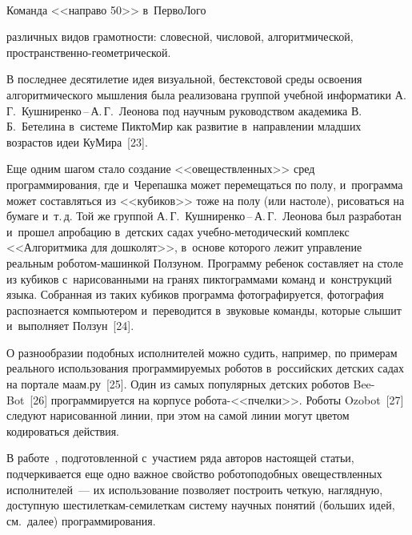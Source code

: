 \begin{multicols}{2}
{ \begin{center}  %
 \vspace*{12pt}
   \mbox{%
 \epsfxsize=79mm 
 }



\vspace*{6pt}
 
{\small{Команда <<направо 50>> в~ПервоЛого
}}
\end{center}}

\noindent
 различных 
видов грамотности: словесной, числовой, алгоритмической, 
про\-стран\-ст\-вен\-но-гео\-мет\-ри\-че\-ской.
  
  В последнее десятилетие идея визуальной, бестекстовой среды освоения 
алгоритмического мышления была реализована группой учебной 
информатики А.\,Г.~Кушниренко\,--\,А.\,Г.~Леонова под научным 
руководством академика В.\,Б.~Бетелина в~системе ПиктоМир как развитие 
в~направлении младших возрастов идеи  КуМира~[23].
  
  Еще одним шагом стало создание <<овеществленных>> сред 
программирования, где и~Черепашка может перемещаться по полу, 
и~программа может составляться из <<кубиков>> тоже на полу (или на\linebreak столе), 
рисоваться на бумаге и~т.\,д. Той же \mbox{груп\-пой} А.\,Г.~Куш\-ни\-рен\-ко\,--\,А.\,Г.~Лео\-но\-ва
 был разработан и~прошел апробацию в~детских садах 
учеб\-но-ме\-то\-ди\-че\-ский комплекс <<Алгоритмика для дошколят>>, в~основе 
которого лежит управление реальным ро\-бо\-том-ма\-шин\-кой Ползуном. 
Программу ребенок составляет на столе из кубиков с~нарисованными на 
гранях пиктограммами команд и~конструкций языка. Собранная из таких 
кубиков программа фотографируется, фотография распознается компьютером и~переводится 
в~звуковые команды, которые слышит и~выполняет 
Ползун~[24].
  
  О разнообразии подобных исполнителей можно судить, например, по 
примерам реального использования программируемых роботов в~российских 
детских садах на портале {\sf маам.ру}~[25]. Один из самых популярных 
детских роботов Bee-Bot~[26] программируется на корпусе ро\-бо\-та-<<пчел\-ки>>.
 Роботы Ozobot~[27] следуют нарисованной линии, при этом на 
самой линии могут цветом кодироваться действия.
  
  В работе~\cite{24-bet}, подготовленной с~участием ряда авторов настоящей 
статьи, подчеркивается еще одно важное свойство роботоподобных 
овеществленных исполнителей~--- их использование позволяет построить 
четкую, наглядную, доступную шести\-лет\-кам-се\-ми\-лет\-кам систему 
научных понятий (больших идей, см.\ далее) программирования.


\end{multicols}
